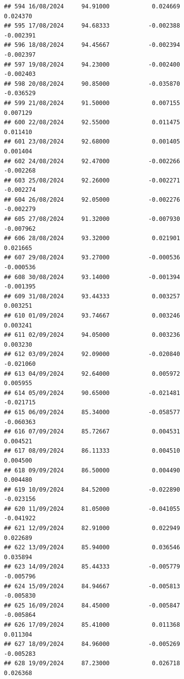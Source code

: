 \documentclass[
]{article}
\begin{document}
\begin{verbatim}
## 594 16/08/2024     94.91000            0.024669                0.024370
## 595 17/08/2024     94.68333           -0.002388               -0.002391
## 596 18/08/2024     94.45667           -0.002394               -0.002397
## 597 19/08/2024     94.23000           -0.002400               -0.002403
## 598 20/08/2024     90.85000           -0.035870               -0.036529
## 599 21/08/2024     91.50000            0.007155                0.007129
## 600 22/08/2024     92.55000            0.011475                0.011410
## 601 23/08/2024     92.68000            0.001405                0.001404
## 602 24/08/2024     92.47000           -0.002266               -0.002268
## 603 25/08/2024     92.26000           -0.002271               -0.002274
## 604 26/08/2024     92.05000           -0.002276               -0.002279
## 605 27/08/2024     91.32000           -0.007930               -0.007962
## 606 28/08/2024     93.32000            0.021901                0.021665
## 607 29/08/2024     93.27000           -0.000536               -0.000536
## 608 30/08/2024     93.14000           -0.001394               -0.001395
## 609 31/08/2024     93.44333            0.003257                0.003251
## 610 01/09/2024     93.74667            0.003246                0.003241
## 611 02/09/2024     94.05000            0.003236                0.003230
## 612 03/09/2024     92.09000           -0.020840               -0.021060
## 613 04/09/2024     92.64000            0.005972                0.005955
## 614 05/09/2024     90.65000           -0.021481               -0.021715
## 615 06/09/2024     85.34000           -0.058577               -0.060363
## 616 07/09/2024     85.72667            0.004531                0.004521
## 617 08/09/2024     86.11333            0.004510                0.004500
## 618 09/09/2024     86.50000            0.004490                0.004480
## 619 10/09/2024     84.52000           -0.022890               -0.023156
## 620 11/09/2024     81.05000           -0.041055               -0.041922
## 621 12/09/2024     82.91000            0.022949                0.022689
## 622 13/09/2024     85.94000            0.036546                0.035894
## 623 14/09/2024     85.44333           -0.005779               -0.005796
## 624 15/09/2024     84.94667           -0.005813               -0.005830
## 625 16/09/2024     84.45000           -0.005847               -0.005864
## 626 17/09/2024     85.41000            0.011368                0.011304
## 627 18/09/2024     84.96000           -0.005269               -0.005283
## 628 19/09/2024     87.23000            0.026718                0.026368

\end{verbatim}
\end{document}
